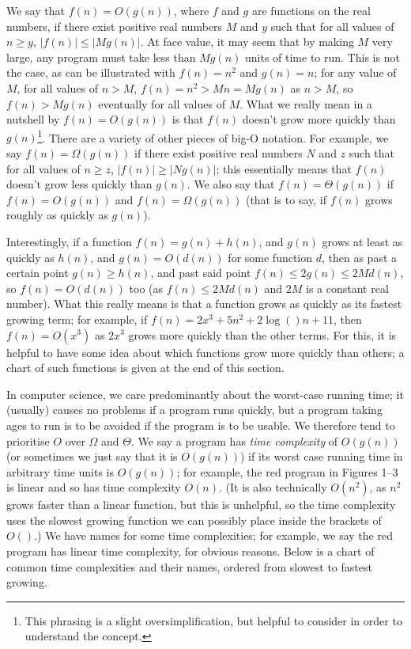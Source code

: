 \documentclass[12pt,a4paper]{report}
\begin{document}
\begin{multicols}{2}
\begin{multicols}{2}
We say that \(f(n)=O(g(n))\), where \(f\) and \(g\) are functions on the real numbers, if there exist positive real numbers \(M\) and \(y\) such that for all values of \(n \geq{} y\), \(|f(n)|\leq{}|Mg(n)|\). At face value, it may seem that by making \(M\) very large, any program must take less than \(Mg(n)\) units of time to run. This is not the case, as can be illustrated with \(f(n)=n^2\) and \(g(n)=n\); for any value of \(M\), for all values of \(n>M\), \(f(n)=n^2>Mn=Mg(n)\) as \(n>M\), so \(f(n)>Mg(n)\) eventually for all values of \(M\). What we really mean in a nutshell by \(f(n)=O(g(n))\) is that \(f(n)\) doesn't grow more quickly than \(g(n)\)\footnote{This phrasing is a slight oversimplification, but helpful to consider in order to understand the concept.}. There are a variety of other pieces of big-O notation. For example, we say \(f(n)=\Omega(g(n))\) if there exist positive real numbers \(N\) and \(z\) such that for all values of \(n \geq{} z\), \(|f(n)|\geq{}|Ng(n)|\); this essentially means that \(f(n)\) doesn't grow less quickly than \(g(n)\)\footnotemark[\value{footnote}]. We also say that \(f(n)=\Theta(g(n))\) if \(f(n)=O(g(n))\) and \(f(n)=\Omega(g(n))\) (that is to say, if \(f(n)\) grows roughly as quickly as \(g(n)\)\footnotemark[\value{footnote}]).

Interestingly, if a function \(f(n)=g(n)+h(n)\), and \(g(n)\) grows at least as quickly as \(h(n)\), and \(g(n)=O(d(n))\) for some function \(d\), then as past a certain point \(g(n)\geq{}h(n)\), and past said point \(f(n)\leq{}2g(n)\leq2Md(n)\), so \(f(n)=O(d(n))\) too (as \(f(n)\leq{}2Md(n)\) and \(2M\) is a constant real number). What this really means is that a function grows as quickly as its fastest growing term; for example, if \(f(n)=2x^3 + 5n^2 + 2\log()n + 11\), then \(f(n)=O(x^3)\) as \(2x^3\) grows more quickly than the other terms. For this, it is helpful to have some idea about which functions grow more quickly than others; a chart of such functions is given at the end of this section.

In computer science, we care predominantly about the worst-case running time; it (usually) causes no problems if a program runs quickly, but a program taking ages to run is to be avoided if the program is to be usable. We therefore tend to prioritise \(O\) over \(\Omega\) and \(\Theta\). We say a program has \textit{time complexity} of \(O(g(n))\) (or sometimes we just say that it is \(O(g(n))\)) if its worst case running time in arbitrary time units is \(O(g(n))\); for example, the red program in Figures 1--3 is linear and so has time complexity \(O(n)\). (It is also technically \(O(n^2)\), as \(n^2\) grows faster than a linear function, but this is unhelpful, so the time complexity uses the slowest growing function we can possibly place inside the brackets of \(O()\).) We have names for some time complexities; for example, we say the red program has linear time complexity, for obvious reasons. Below is a chart of common time complexities and their names, ordered from slowest to fastest growing.


\end{multicols}
\end{multicols}
\end{document}
